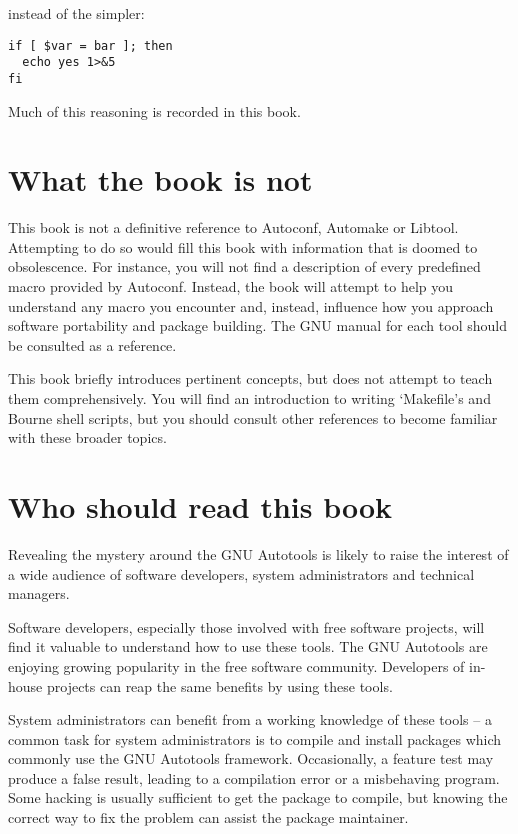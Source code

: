  instead of the simpler: 

 
\begin{verbatim}
if [ $var = bar ]; then
  echo yes 1>&5
fi
\end{verbatim}

Much of this reasoning is recorded in this book.

\section{What the book is not}


This book is not a definitive reference to Autoconf, Automake or Libtool. Attempting to do so would fill this book with information that is doomed to obsolescence. For instance, you will not find a description of every predefined macro provided by Autoconf. Instead, the book will attempt to help you understand any macro you encounter and, instead, influence how you approach software portability and package building. The GNU manual for each tool should be consulted as a reference. 


This book briefly introduces pertinent concepts, but does not attempt to teach them comprehensively. You will find an introduction to writing `Makefile's and Bourne shell scripts, but you should consult other references to become familiar with these broader topics. 

\section{Who should read this book}


Revealing the mystery around the GNU Autotools is likely to raise the interest of a wide audience of software developers, system administrators and technical managers. 


Software developers, especially those involved with free software projects, will find it valuable to understand how to use these tools. The GNU Autotools are enjoying growing popularity in the free software community. Developers of in-house projects can reap the same benefits by using these tools. 


System administrators can benefit from a working knowledge of these tools -- a common task for system administrators is to compile and install packages which commonly use the GNU Autotools framework. Occasionally, a feature test may produce a false result, leading to a compilation error or a misbehaving program. Some hacking is usually sufficient to get the package to compile, but knowing the correct way to fix the problem can assist the package maintainer. 


